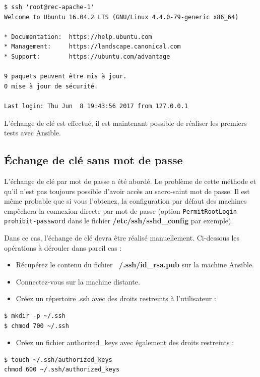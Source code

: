 \documentclass[hidelinks]{article}
\begin{document}
\begin{verbatim}
$ ssh 'root@rec-apache-1' 
Welcome to Ubuntu 16.04.2 LTS (GNU/Linux 4.4.0-79-generic x86_64)  
    
* Documentation:  https://help.ubuntu.com  
* Management:     https://landscape.canonical.com  
* Support:        https://ubuntu.com/advantage  
    
9 paquets peuvent être mis à jour.  
0 mise à jour de sécurité.  
    
Last login: Thu Jun  8 19:43:56 2017 from 127.0.0.1
\end{verbatim}

L'échange de clé est effectué, il est maintenant possible de réaliser les premiers tests avec Ansible.

\subsection{Échange de clé sans mot de passe}

L'échange de clé par mot de passe a été abordé. Le problème de cette méthode et qu'il n'est pas toujours possible d'avoir accès au sacro-saint mot de passe. Il est même probable que si vous l'obtenez, la configuration par défaut des machines empêchera la connexion directe par mot de passe (option \texttt{PermitRootLogin prohibit-password} dans le fichier \textbf{/etc/ssh/sshd_config} par exemple).

Dans ce cas, l'échange de clé devra être réalisé manuellement. Ci-dessous les opérations à dérouler dans pareil cas :
\begin{itemize}
    \item Récupérez le contenu du fichier \textbf{~/.ssh/id_rsa.pub} sur la machine Ansible. 
    \item Connectez-vous sur la machine distante.
    \item Créez un répertoire .ssh avec des droits restreints à l'utilisateur :
\end{itemize} 

\begin{verbatim}
$ mkdir -p ~/.ssh 
$ chmod 700 ~/.ssh
\end{verbatim}

\begin{itemize}
    \item Créez un fichier authorized_keys avec également des droits restreints :
\end{itemize}

\begin{verbatim}
$ touch ~/.ssh/authorized_keys 
chmod 600 ~/.ssh/authorized_keys    
\end{verbatim}
\end{document}

